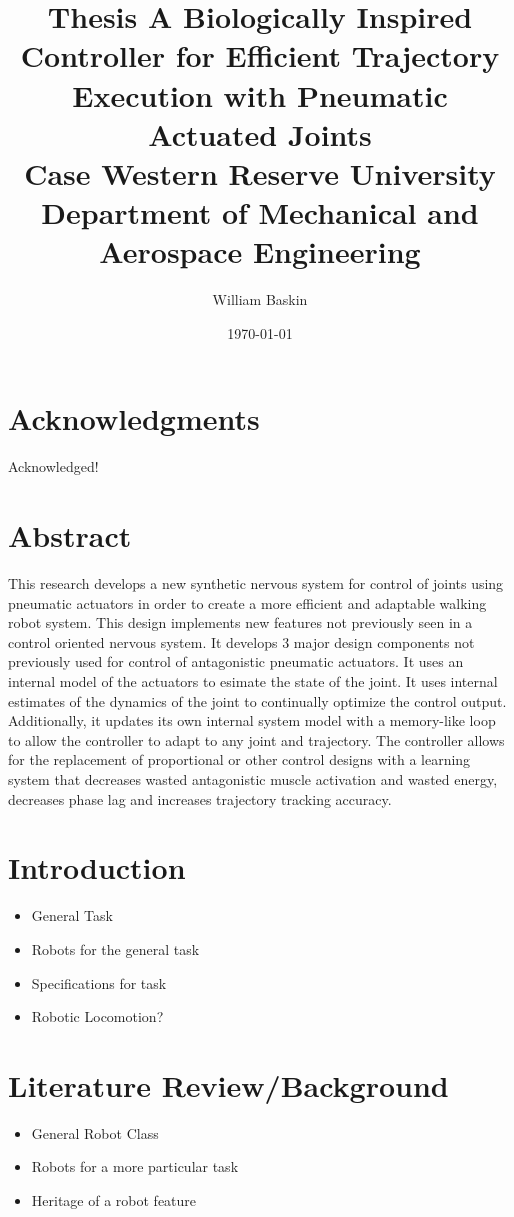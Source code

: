 \documentclass[12pt, letterpaper, oneside, onecolumn]{report} %
\author{William Baskin}
\title{Thesis}
\title{
  {A Biologically Inspired Controller for Efficient Trajectory Execution with Pneumatic Actuated Joints}\\
  {\large Case Western Reserve University \\
  Department of Mechanical and Aerospace Engineering}%
}
\date{\today}
\begin{document}
\maketitle


\tableofcontents

\listoffigures

\chapter*{Acknowledgments}
Acknowledged!

\chapter*{Abstract}
This research develops a new synthetic nervous system for control of joints using pneumatic actuators in order to create a more efficient and adaptable walking robot system. This design implements new features not previously seen in a control oriented nervous system. It develops 3 major design components not previously used for control of antagonistic pneumatic actuators. It uses an internal model of the actuators to esimate the state of the joint. It uses internal estimates of the dynamics of the joint to continually optimize the control output. Additionally, it updates its own internal system model with a memory-like loop to allow the controller to adapt to any joint and trajectory. The controller allows for the replacement of proportional or other control designs with a learning system that decreases wasted antagonistic muscle activation and wasted energy, decreases phase lag and increases trajectory tracking accuracy.

\chapter{Introduction}
\begin{itemize}
\item General Task
\item Robots for the general task
\item Specifications for task
\item Robotic Locomotion?
\end{itemize}


\chapter{Literature Review/Background}
\begin{itemize}
\item General Robot Class
\item Robots for a more particular task
\item Heritage of a robot feature
\end{itemize}

\end{document}
